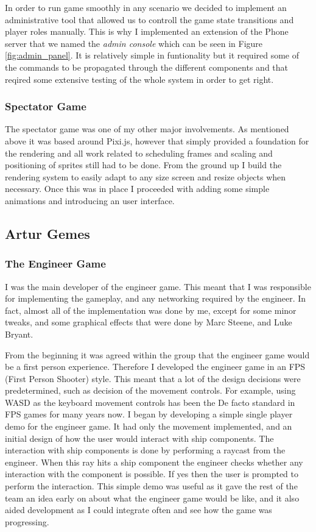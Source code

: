 \documentclass[a4paper,11pt]{article}
\begin{document}
In order to run game smoothly in any scenario we decided to implement an administrative tool that allowed us to controll the game state transitions and player roles manually. This is why I implemented an extension of the Phone server that we named the \emph{admin console} which can be seen in Figure \ref{fig:admin_panel}. It is relatively simple in funtionality but it required some of the commands to be propagated through the different components and that reqired some extensive testing of the whole system in order to get right.

\subsubsection{Spectator Game}

The spectator game was one of my other major involvements. As mentioned above it was based around Pixi.js, however that simply provided a foundation for the rendering and all work related to scheduling frames and scaling and positioning of sprites still had to be done. From the ground up I build the rendering system to easily adapt to any size screen and resize objects when necessary. Once this was in place I proceeded with adding some simple animations and introducing an user interface.

\clearpage

\subsection{Artur Gemes}

\subsubsection{The Engineer Game}

I was the main developer of the engineer game. This meant that I was responsible for implementing the gameplay, and any networking required by the engineer. In fact, almost all of the implementation was done by me, except for some minor tweaks, and some graphical effects that were done by Marc Steene, and Luke Bryant.

From the beginning it was agreed within the group that the engineer game would be a first person experience. Therefore I developed the engineer game in an FPS (First Person Shooter) style. This meant that a lot of the design decisions were predetermined, such as decision of the movement controls. For example, using WASD as the keyboard movement controls has been the De facto standard in FPS games for many years now. I began by developing a simple single player demo for the engineer game. It had only the movement implemented, and an initial design of how the user would interact with ship components. The interaction with ship components is done by performing a raycast from the engineer. When this ray hits a ship component the engineer checks whether any interaction with the component is possible. If yes then the user is prompted to perform the interaction. This simple demo was useful as it gave the rest of the team an idea early on about what the engineer game would be like, and it also aided development as I could integrate often and see how the game was progressing.
\end{document}
